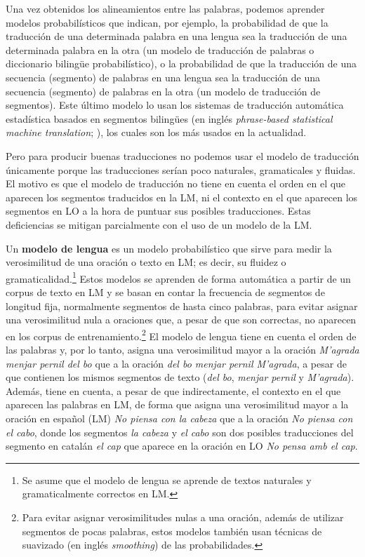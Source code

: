 Una vez obtenidos los alineamientos entre las palabras, podemos aprender modelos probabilísticos que indican, por ejemplo, la probabilidad de que la traducción de una determinada palabra en una lengua sea la traducción de una determinada palabra en la otra (un modelo de traducción de palabras o diccionario bilingüe probabilístico), o la probabilidad de que la traducción de una secuencia (segmento) de palabras en una lengua sea la traducción de una secuencia (segmento) de palabras en la otra (un modelo de traducción de segmentos). Este último modelo lo usan los sistemas de traducción automática estadística basados en segmentos bilingües (en inglés \emph{phrase-based statistical machine translation}; \cite{koehnbook}), los cuales son los más usados en la actualidad. 

Pero para producir buenas traducciones no podemos usar el modelo de traducción únicamente porque las traducciones serían poco naturales, gramaticales y fluidas. El motivo es que el modelo de traducción no tiene en cuenta el orden en el que aparecen los segmentos traducidos en la LM, ni el contexto en el que aparecen los segmentos en LO a la hora de puntuar sus posibles traducciones. Estas deficiencias se mitigan parcialmente con el uso de un modelo de la LM. 

Un \textbf{modelo de lengua} es un modelo probabilístico que sirve para medir la verosimilitud de una oración o texto en LM; es decir, su fluidez o gramaticalidad.\footnote{Se asume que el modelo de lengua se aprende de textos naturales y gramaticalmente correctos en LM.} Estos modelos se aprenden de forma automática a partir de un corpus de texto en LM y se basan en contar la frecuencia de segmentos de longitud fija, normalmente segmentos de hasta cinco palabras, para evitar asignar una verosimilitud nula a oraciones que, a pesar de que son correctas, no aparecen en los corpus de entrenamiento.\footnote{Para evitar asignar verosimilitudes nulas a una oración, además de utilizar segmentos de pocas palabras, estos modelos también usan técnicas de suavizado (en inglés \emph{smoothing}) de las probabilidades.} El modelo de lengua tiene en cuenta el orden de las palabras y, por lo tanto, asigna una verosimilitud mayor a la oración \emph{M'agrada menjar pernil del bo} que a la oración \emph{del bo menjar pernil M'agrada}, a pesar de que contienen los mismos segmentos de texto (\emph{del bo}, \emph{menjar pernil} y \emph{M'agrada}). Además, tiene en cuenta, a pesar de que indirectamente, el contexto en el que aparecen las palabras en LM, de forma que asigna una verosimilitud mayor a la oración en español (LM) \emph{No piensa con la cabeza} que a la oración \emph{No piensa con el cabo}, donde los segmentos \emph{la cabeza} y \emph{el cabo} son dos posibles traducciones del segmento en catalán \emph{el cap} que aparece en la oración en LO \emph{No pensa amb el cap}. 


